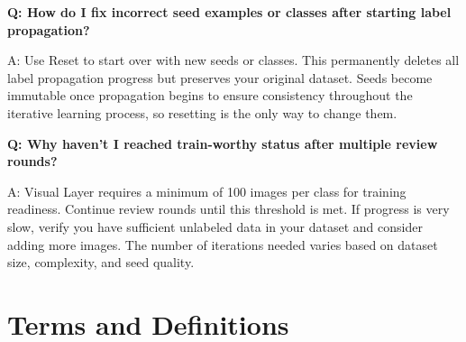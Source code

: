 \documentclass[
  11pt,
  a4paper,
  11pt,
  oneside]{report}
\begin{document}
\textbf{Q: How do I fix incorrect seed examples or classes after
starting label propagation?}

A: Use Reset to start over with new seeds or classes. This permanently
deletes all label propagation progress but preserves your original
dataset. Seeds become immutable once propagation begins to ensure
consistency throughout the iterative learning process, so resetting is
the only way to change them.

\textbf{Q: Why haven't I reached train-worthy status after multiple
review rounds?}

A: Visual Layer requires a minimum of 100 images per class for training
readiness. Continue review rounds until this threshold is met. If
progress is very slow, verify you have sufficient unlabeled data in your
dataset and consider adding more images. The number of iterations needed
varies based on dataset size, complexity, and seed quality.

\chapter{Terms and Definitions}\label{terms-and-definitions}
\end{document}
